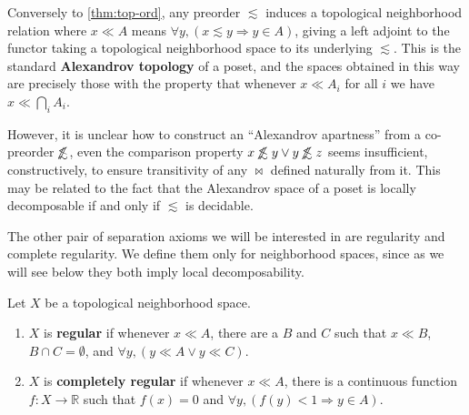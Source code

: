\documentclass{article}
\def\R{\mathbb{R}}
\def\oapt{\mathrel{\!\not\,\not\lesssim}}
\def\leapx{\lesssim}
\let\implies\Rightarrow
\def\inv{^{-1}}
\begin{document}
\begin{rmk}
  Conversely to \cref{thm:top-ord}, any preorder $\leapx$ induces a topological neighborhood relation where $x\ll A$ means $\forall y, (x\leapx y \implies y\in A)$, giving a left adjoint to the functor taking a topological neighborhood space to its underlying $\leapx$.
  This is the standard \textbf{Alexandrov topology} of a poset, and the spaces obtained in this way are precisely those with the property that whenever $x\ll A_i$ for all $i$ we have $x\ll \bigcap_i A_i$.
  


  However, it is unclear how to construct an ``Alexandrov apartness'' from a co-preorder $\oapt$, even the comparison property $x\oapt y \lor y\oapt z$ seems insufficient, constructively, to ensure transitivity of any $\bowtie$ defined naturally from it.
  This may be related to the fact that the Alexandrov space of a poset is locally decomposable if and only if $\leapx$ is decidable.
\end{rmk}

The other pair of separation axioms we will be interested in are regularity and complete regularity.
We define them only for neighborhood spaces, since as we will see below they both imply local decomposability.

\begin{defn}
  Let $X$ be a topological neighborhood space.
  \begin{enumerate}
  \item $X$ is \textbf{regular} if whenever $x\ll A$, there are a $B$ and $C$ such that $x\ll B$, $B\cap C = \emptyset$, and $\forall y, (y\ll A \lor y\ll C)$.
  \item $X$ is \textbf{completely regular} if whenever $x\ll A$, there is a continuous function $f:X\to \R$ such that $f(x)=0$ and $\forall y, (f(y)<1 \implies y\in A)$.
  \end{enumerate}
\end{defn}
\end{document}
